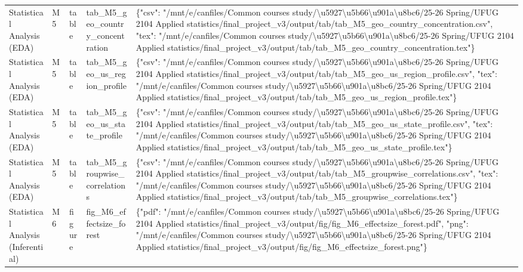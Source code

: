 \begin{tabular}{lllll}
Statistical Analysis (EDA) & M5 & table & tab\_M5\_geo\_country\_concentration & \{"csv": "/mnt/e/canfiles/Common courses study/\textbackslash u5927\textbackslash u5b66\textbackslash u901a\textbackslash u8bc6/25-26 Spring/UFUG 2104 Applied statistics/final\_project\_v3/output/tab/tab\_M5\_geo\_country\_concentration.csv", "tex": "/mnt/e/canfiles/Common courses study/\textbackslash u5927\textbackslash u5b66\textbackslash u901a\textbackslash u8bc6/25-26 Spring/UFUG 2104 Applied statistics/final\_project\_v3/output/tab/tab\_M5\_geo\_country\_concentration.tex"\} \\
Statistical Analysis (EDA) & M5 & table & tab\_M5\_geo\_us\_region\_profile & \{"csv": "/mnt/e/canfiles/Common courses study/\textbackslash u5927\textbackslash u5b66\textbackslash u901a\textbackslash u8bc6/25-26 Spring/UFUG 2104 Applied statistics/final\_project\_v3/output/tab/tab\_M5\_geo\_us\_region\_profile.csv", "tex": "/mnt/e/canfiles/Common courses study/\textbackslash u5927\textbackslash u5b66\textbackslash u901a\textbackslash u8bc6/25-26 Spring/UFUG 2104 Applied statistics/final\_project\_v3/output/tab/tab\_M5\_geo\_us\_region\_profile.tex"\} \\
Statistical Analysis (EDA) & M5 & table & tab\_M5\_geo\_us\_state\_profile & \{"csv": "/mnt/e/canfiles/Common courses study/\textbackslash u5927\textbackslash u5b66\textbackslash u901a\textbackslash u8bc6/25-26 Spring/UFUG 2104 Applied statistics/final\_project\_v3/output/tab/tab\_M5\_geo\_us\_state\_profile.csv", "tex": "/mnt/e/canfiles/Common courses study/\textbackslash u5927\textbackslash u5b66\textbackslash u901a\textbackslash u8bc6/25-26 Spring/UFUG 2104 Applied statistics/final\_project\_v3/output/tab/tab\_M5\_geo\_us\_state\_profile.tex"\} \\
Statistical Analysis (EDA) & M5 & table & tab\_M5\_groupwise\_correlations & \{"csv": "/mnt/e/canfiles/Common courses study/\textbackslash u5927\textbackslash u5b66\textbackslash u901a\textbackslash u8bc6/25-26 Spring/UFUG 2104 Applied statistics/final\_project\_v3/output/tab/tab\_M5\_groupwise\_correlations.csv", "tex": "/mnt/e/canfiles/Common courses study/\textbackslash u5927\textbackslash u5b66\textbackslash u901a\textbackslash u8bc6/25-26 Spring/UFUG 2104 Applied statistics/final\_project\_v3/output/tab/tab\_M5\_groupwise\_correlations.tex"\} \\
Statistical Analysis (Inferential) & M6 & figure & fig\_M6\_effectsize\_forest & \{"pdf": "/mnt/e/canfiles/Common courses study/\textbackslash u5927\textbackslash u5b66\textbackslash u901a\textbackslash u8bc6/25-26 Spring/UFUG 2104 Applied statistics/final\_project\_v3/output/fig/fig\_M6\_effectsize\_forest.pdf", "png": "/mnt/e/canfiles/Common courses study/\textbackslash u5927\textbackslash u5b66\textbackslash u901a\textbackslash u8bc6/25-26 Spring/UFUG 2104 Applied statistics/final\_project\_v3/output/fig/fig\_M6\_effectsize\_forest.png"\} \\

\end{tabular}
